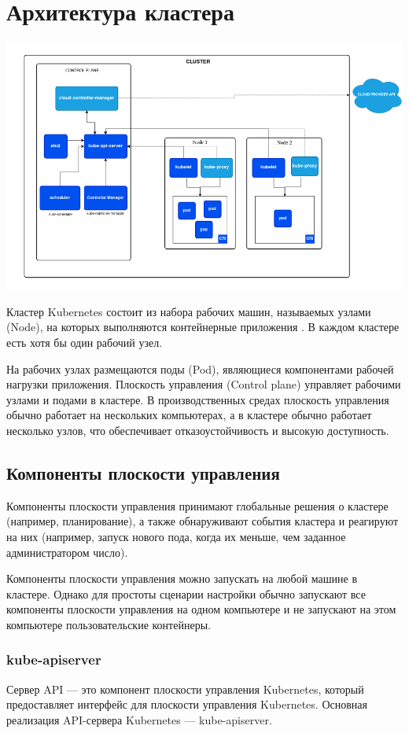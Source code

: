 \documentclass[a4page]{article}
\begin{document}
\section{Архитектура кластера}
\includegraphics[width=450pt]{cluster-architecture.png}

Кластер Kubernetes состоит из набора рабочих машин, называемых узлами (Node), на которых выполняются контейнерные приложения \cite{k8s:cluster-architecture}. В каждом кластере есть хотя бы один рабочий узел.

На рабочих узлах размещаются поды (Pod), являющиеся компонентами рабочей нагрузки приложения. Плоскость управления (Control plane) управляет рабочими узлами и подами в кластере. В производственных средах плоскость управления обычно работает на нескольких компьютерах, а в кластере обычно работает несколько узлов, что обеспечивает отказоустойчивость и высокую доступность\cite{k8s:components}.

\subsection{Компоненты плоскости управления}
Компоненты плоскости управления принимают глобальные решения о кластере (например, планирование), а также обнаруживают события кластера и реагируют на них (например, запуск нового пода, когда их меньше, чем заданное администратором число)\cite{k8s:cp-components}.

Компоненты плоскости управления можно запускать на любой машине в кластере. Однако для простоты сценарии настройки обычно запускают все компоненты плоскости управления на одном компьютере и не запускают на этом компьютере пользовательские контейнеры.

\subsubsection{kube-apiserver}
Сервер API --- это компонент плоскости управления Kubernetes, который \\предоставляет интерфейс для плоскости управления Kubernetes. Основная реализация API-сервера Kubernetes --- kube-apiserver.
\end{document}
